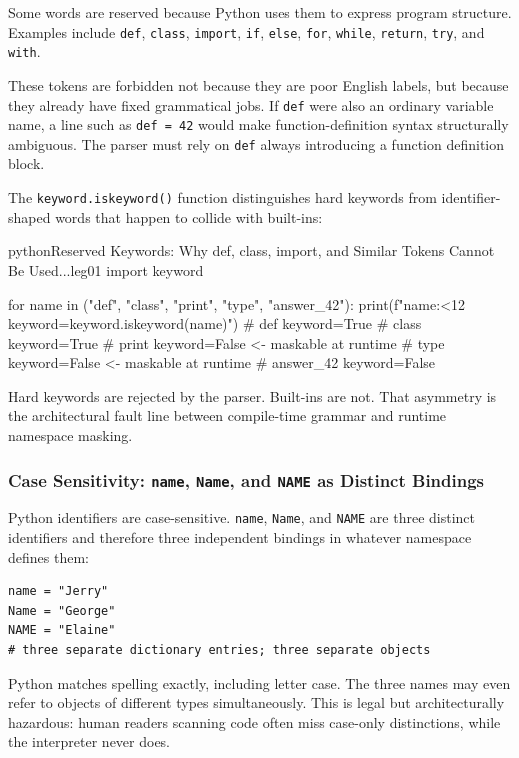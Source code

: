 \documentclass[a4paper,twoside]{report}
\begin{document}
Some words are reserved because Python uses them to express program structure. Examples include \texttt{def}, \texttt{class}, \texttt{import}, \texttt{if}, \texttt{else}, \texttt{for}, \texttt{while}, \texttt{return}, \texttt{try}, and \texttt{with}.

These tokens are forbidden not because they are poor English labels, but because they already have fixed grammatical jobs. If \texttt{def} were also an ordinary variable name, a line such as \texttt{def = 42} would make function-definition syntax structurally ambiguous. The parser must rely on \texttt{def} always introducing a function definition block.

The \texttt{keyword.iskeyword()} function distinguishes hard keywords from identifier-shaped words that happen to collide with built-ins:

\begin{codebox}[]{python}{Reserved Keywords: Why def, class, import, and Similar Tokens Cannot Be Used...}{leg01}
import keyword

for name in ("def", "class", "print", "type", "answer_42"):
    print(f"{name:<12} keyword={keyword.iskeyword(name)}")
# def          keyword=True
# class        keyword=True
# print        keyword=False   <- maskable at runtime
# type         keyword=False   <- maskable at runtime
# answer_42    keyword=False
\end{codebox}


Hard keywords are rejected by the parser. Built-ins are not. That asymmetry is the architectural fault line between compile-time grammar and runtime namespace masking.

\subsubsection{Case Sensitivity: \texttt{name}, \texttt{Name}, and \texttt{NAME} as Distinct Bindings}

Python identifiers are case-sensitive. \texttt{name}, \texttt{Name}, and \texttt{NAME} are three distinct identifiers and therefore three independent bindings in whatever namespace defines them:

\begin{verbatim}
name = "Jerry"
Name = "George"
NAME = "Elaine"
# three separate dictionary entries; three separate objects
\end{verbatim}

Python matches spelling exactly, including letter case. The three names may even refer to objects of different types simultaneously. This is legal but architecturally hazardous: human readers scanning code often miss case-only distinctions, while the interpreter never does.
\end{document}
